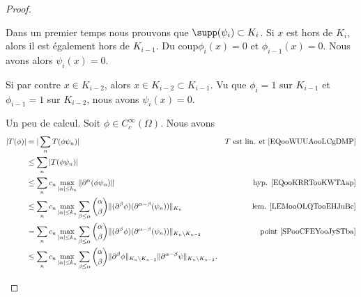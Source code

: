 \begin{proof}
\begin{subproof}
				\label{SPooCFEYooJySTba}
		Dans un premier temps nous prouvons que \( \supp(\psi_i)\subset K_i\). Si \( x\) est hors de \( K_i\), alors il est également hors de \( K_{i-1}\). Du coup\( \phi_i(x)=0\) et \( \phi_{i-1}(x)=0\). Nous avons alors \( \psi_i(x)=0\).

		Si par contre \( x\in K_{i-2}\), alors \( x\in K_{i-2}\subset K_{i-1}\). Vu que \( \phi_i=1\) sur \( K_{i-1}\) et \( \phi_{i-1}=1\) sur \( K_{i-2}\), nous avons \( \psi_i(x)=0\).

		Un peu de calcul. Soit \( \phi\in C_c^{\infty}(\Omega)\). Nous avons
		\begin{subequations}
			\begin{align}
				| T(\phi) | & = | \sum_nT(\phi\psi_n) |                                                                                                                                                                          & \text{\( T\) est lin. et \eqref{EQooWUUAooLCgDMP}} \\
				            & \leq \sum_n| T(\phi\psi_n) |                                                                                                                                                                                                                            \\
				            & \leq \sum_n c_n\max_{| \alpha |\leq k_n}\| \partial^{\alpha}(\phi\psi_n) \|                                                                                                                        & \text{hyp. \eqref{EQooKRRTooKWTAap}}               \\
				            & \leq \sum_nc_n\max_{| \alpha |\leq k_n}\sum_{\beta\leq \alpha}\binom{ \alpha }{ \beta }\| (\partial^{\beta}\phi)(\partial^{\alpha-\beta}(\psi_n)) \|_{K_n}                                         & \text{lem. \ref{LEMooOLQTooEHJuBc}}                \\
				            & = \sum_nc_n\max_{| \alpha |\leq k_n}\sum_{\beta\leq \alpha}\binom{ \alpha }{ \beta }\| (\partial^{\beta}\phi)(\partial^{\alpha-\beta}(\psi_n)) \|_{K_n\setminus K_{n-2}}                           & \text{point \ref{SPooCFEYooJySTba}}                \\
				            & \leq \sum_n c_n\max_{| \alpha |\leq k_n}\sum_{\beta\leq \alpha}\binom{ \alpha }{ \beta }\| \partial^{\beta}\phi \|_{K_n\setminus K_{n-2}}\| \partial^{\alpha-\beta}\psi \|_{K_n\setminus K_{n-2}}.

\end{align}
\end{subequations}
\end{subproof}
\end{proof}
